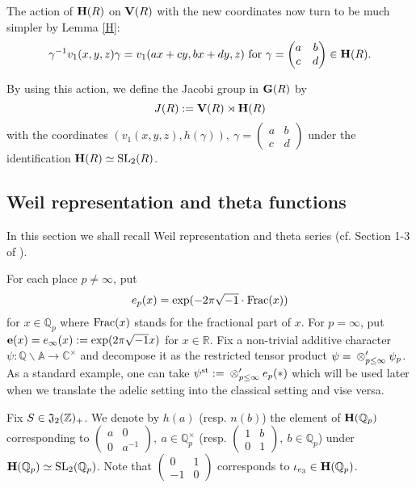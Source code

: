 \documentclass[11pt]{amsart}
\numberwithin{equation}{section}
\theoremstyle{definition}
\begin{document}
The action of $\bold H(R)$ on $\bold V(R)$ with the new coordinates  now turn to be much simpler by Lemma \ref{H}:
\begin{equation}\label{h2}
\gamma^{-1} v_1(x,y,z) \gamma=v_1(ax+cy, bx+dy,z) \ 
{\rm for}\ \gamma=\begin{pmatrix} a&b\\c&d\end{pmatrix}\in \bold H(R). 
\end{equation}

By using this action, we define the Jacobi group in $\bold G(R)$ by 
\begin{equation}\label{jacobi}
J(R):=\bold V(R)\rtimes \bold H(R) 
\end{equation}
with the coordinates $(v_1(x,y,z),h(\gamma)),\ \gamma=\begin{pmatrix} a&b\\c&d\end{pmatrix}$ under the identification 
$\bold H(R)\simeq {\rm SL}_2(R)$. 

\subsection{Weil representation and theta functions}\label{weil-rep}
In this section we shall recall Weil representation and theta series (cf. Section 1-3 of \cite{Ik3}). 

For each place $p\not=\infty$, put 
$$e_p(x)=\exp(-2\pi\sqrt{-1}\cdot{\rm Frac}(x))$$ for $x\in {\mathbb{Q}}_p$ where 
${\rm Frac}(x)$ stands for the fractional part of $x$. For $p=\infty$, put $\bold{e}(x)=e_\infty(x):=\exp(2\pi \sqrt{-1}x)$ for 
$x\in {\mathbb{R}}$. 
Fix a non-trivial additive character $\psi:{\mathbb{Q}}{\backslash}{\mathbb{A}}{\longrightarrow} {\mathbb{C}}^\times$ and decompose it as the restricted tensor product 
$\psi={\displaystyle}\otimes'_{p\le \infty}\psi_p$. As a standard example, one can take $\psi^{{\rm st}}:={\displaystyle}\otimes'_{p\le \infty}e_p(\ast)$ which 
will be used later when we translate the adelic setting into the classical setting and vise versa.  

Fix $S\in \frak J_2({\mathbb{Z}})_{+}$. 
We denote by $h(a)$ (resp. $n(b)$) the element of $\bold H({\mathbb{Q}}_p)$ corresponding to 
$\left(\begin{array}{cc}
a & 0 \\
0 & a^{-1}
\end{array}\right),\ a\in {\mathbb{Q}}^\times_p$ (resp. $\left(\begin{array}{cc}
1 & b  \\
0 & 1
\end{array}\right),\ b\in {\mathbb{Q}}_p$) under $\bold H({\mathbb{Q}}_p)\simeq {\rm SL}_2({\mathbb{Q}}_p)$. Note that 
$\left(\begin{array}{cc}
0 & 1 \\
-1 & 0
\end{array}\right)$ corresponds to $\iota_{e_3}\in \bold H({\mathbb{Q}}_p)$.  
\end{document}
